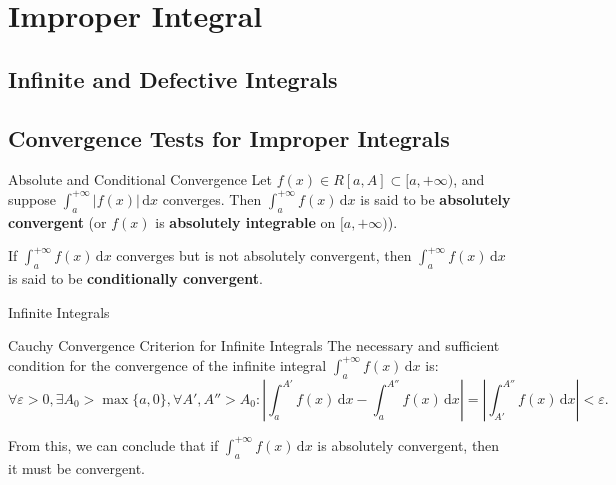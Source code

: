\documentclass[11pt]{../../TexTemplate/elegantbook}
\begin{document}
\chapter{Improper Integral}
\section{Infinite and Defective Integrals}

\section{Convergence Tests for Improper Integrals}

\begin{definition}{Absolute and Conditional Convergence}
    Let \( f(x) \in R[a, A] \subset [a, +\infty) \), and suppose \( \int_{a}^{+\infty} |f(x)| \, \mathrm{d}x \) converges. 
    Then \( \int_{a}^{+\infty} f(x) \, \mathrm{d}x \) is said to be \textbf{absolutely convergent} 
    (or \( f(x) \) is \textbf{absolutely integrable} on \( [a, +\infty) \)).

    If \( \int_{a}^{+\infty} f(x) \, \mathrm{d}x \) converges but is not absolutely convergent, 
    then \( \int_{a}^{+\infty} f(x) \, \mathrm{d}x \) is said to be \textbf{conditionally convergent}.
\end{definition}

\begin{leftbarTitle}{Infinite Integrals}\end{leftbarTitle}
\begin{theorem}{Cauchy Convergence Criterion for Infinite Integrals}
    The necessary and sufficient condition for the convergence of 
    the infinite integral \( \int_{a}^{+\infty} f(x) \, \mathrm{d}x \) is:
    \[
    \forall \varepsilon > 0, \exists A_0 > \max\{ a, 0 \}, \forall A', A'' > A_0 : 
    \left| \int_{a}^{A'} f(x) \, \mathrm{d}x - \int_{a}^{A''} f(x) \, \mathrm{d}x \right| 
    = \left| \int_{A'}^{A''} f(x) \, \mathrm{d}x \right| < \varepsilon.
    \]
\end{theorem}
From this, we can conclude that if \( \int_{a}^{+\infty} f(x) \, \mathrm{d}x \) is absolutely convergent, 
then it must be convergent.
\end{document}
